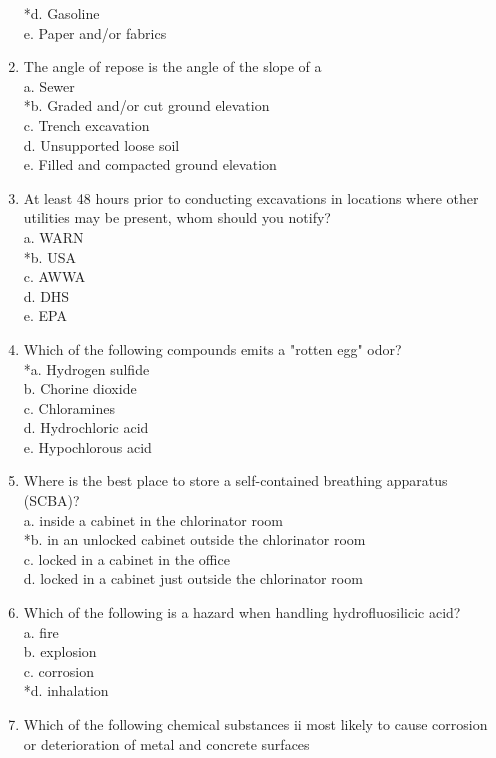 \begin{enumerate}[1.]
*d. Gasoline\\
e. Paper and/or fabrics\\
\item The angle of repose is the angle of the slope of a\\
a. Sewer\\
*b. Graded and/or cut ground elevation\\
c. Trench excavation\\
d. Unsupported loose soil\\
e. Filled and compacted ground elevation\\
\item At least 48 hours prior to conducting excavations in locations where other utilities may be present, whom should you notify?\\
a. WARN\\
*b. USA\\
c. AWWA\\
d. DHS\\
e. EPA\\
\item Which of the following compounds emits a "rotten egg" odor?\\
*a. Hydrogen sulfide\\
b. Chorine dioxide\\
c. Chloramines\\
d. Hydrochloric acid\\
e. Hypochlorous acid\\
\item Where is the best place to store a self-contained breathing apparatus (SCBA)?\\
a. inside a cabinet in the chlorinator room\\
*b. in an unlocked cabinet outside the chlorinator room\\
c. locked in a cabinet in the office\\
d. locked in a cabinet just outside the chlorinator room\\
\item Which of the following is a hazard when handling hydrofluosilicic acid?\\
a. fire\\
b. explosion\\
c. corrosion\\
*d. inhalation\\
\item Which of the following chemical substances ii most likely to cause corrosion or deterioration of metal and concrete surfaces\\

\end{enumerate}
